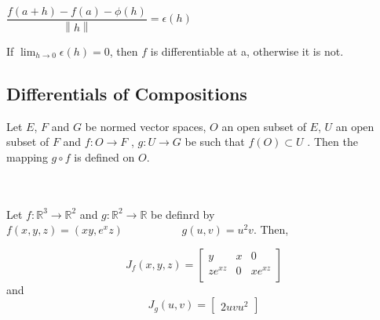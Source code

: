 \documentclass[11 pt]{article}
\theoremstyle{definition}
\theoremstyle{remark}
\newcommand{\R}{\mathbb{R}}
\newcommand\norm[1]{\left\lVert#1\right\rVert}
\begin{document}
\begin{center}

$ \dfrac{f(a+h) - f(a) - \phi (h)}{\norm{h}} = \epsilon (h)$
\end{center}

If $\lim_{h \to 0} \epsilon (h) =  0$, then $f$ is differentiable at a, otherwise it is not. \\

\newpage

\subsection{Differentials of Compositions}

Let $E$, $F$ and $G$ be normed vector spaces, $O$ an open subset of $E$, $U$ an open subset of $F$ and $f : O \rightarrow F$ , $g : U \rightarrow G$ be such that $f(O) \subset U$ . Then the mapping $g \circ f$ is defined on $O$.

\\

\\

\example Let $f: \R^3 \rightarrow \R^2$ and $ g : \R^2 \rightarrow \R$ be definrd by\\
\hspace*{2cm} $ f(x,y,z) = (xy, e^xz)$ ~ ~ ~ ~ ~ ~ $ g(u,v) = u^2v$. Then,
\begin{center}

\[
J_f (x,y,z)=
  \begin{bmatrix}
  	y & x & 0 \\
    ze^{xz} & 0 & xe^{xz} \\
  \end{bmatrix}
\] and 
\[
J_g (u, v)=
  \begin{bmatrix}
  	2uv u^2
  \end{bmatrix}
\]

\end{center}
 
\end{document}
